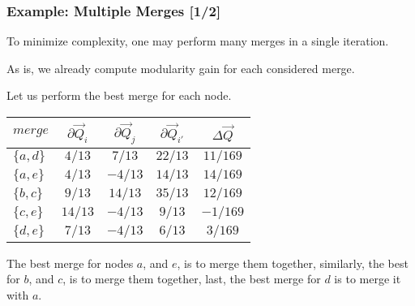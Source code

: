 \documentclass{beamer}
\begin{document}
\begin{frame}

    \frametitle{Example: Multiple Merges [1/2]}

    To minimize complexity, one may perform many merges in a single iteration.\pause

    \vspace{2.5mm}
    As is, we already compute modularity gain for each considered merge.\pause

    \vspace{2.5mm}
    Let us perform the best merge for each node.\pause

    \vspace{2.5mm}
    \begin{center}
        \begin{tabular}{l | c c c c} 
            $ merge    $ & $ \partial \vec{Q}_{i} $ & $ \partial \vec{Q}_{j} $ & $ \partial \vec{Q}_{i'} $ & $ \Delta \vec{Q} $ \\
            \hline
            \rowcolor{ummaize}
            $ \{a, d\} $ & $ 4/13  $ & $  7/13  $ & $ 22/13 $ & $ 11/169 $ \\
            \rowcolor{ummaize}
            $ \{a, e\} $ & $ 4/13  $ & $ -4/13  $ & $ 14/13 $ & $ 14/169 $ \\
            \rowcolor{ummaize}
            $ \{b, c\} $ & $  9/13 $ & $  14/13 $ & $ 35/13 $ & $ 12/169 $ \\
            $ \{c, e\} $ & $ 14/13 $ & $ -4/13  $ & $  9/13 $ & $ -1/169 $ \\
            $ \{d, e\} $ & $  7/13 $ & $ -4/13  $ & $  6/13 $ & $  3/169 $ \\
        \end{tabular}
    \end{center}\pause

    \vspace{2.5mm}
    The best merge for nodes $ a $, and $ e $, is to merge them together, similarly, the best for $ b $, and $ c $, is to merge them together, last, the best merge for $ d $ is to merge it with $ a $. 

\end{frame}
\end{document}
